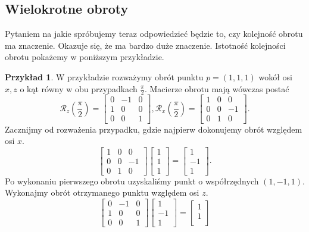 \documentclass[a4paper,twoside,11pt,reqno]{mwrep}
\theoremstyle{plain} \newtheorem{twr}{Twierdzenie}
\theoremstyle{plain} \newtheorem{lem}{Lemat}
\theoremstyle{definition} \newtheorem{defi}{Definicja}
\theoremstyle{remark} \newtheorem*{wni}{Wniosek}
\theoremstyle{definition} \newtheorem{uwaga}{Uwaga}
\theoremstyle{definition}\newtheorem{prz}{Przykład}
\begin{document}
\subsection{Wielokrotne obroty}
Pytaniem na jakie spróbujemy teraz odpowiedzieć będzie to, czy kolejność obrotu ma znaczenie. Okazuje się, że ma bardzo duże znaczenie. 
Istotność kolejności obrotu pokażemy w poniższym przykładzie.
\begin{prz}\label{PrzykladWielokrotnyObrot}
W przykładzie rozważymy obrót punktu $p=(1,1,1)$ wokół osi $x,z$ 
o kąt równy w obu przypadkach $\frac{\pi}{2}$.
Macierze obrotu mają wówczas postać
$$
\mathcal{R}_z\left(\frac{\pi}{2}
\right)=
 \begin{bmatrix}
0   & -1&0 \\
1 & 0 & 0\\
0&0&1
\end{bmatrix},\mathcal{R}_x\left(\frac{\pi}{2}
\right)=\begin{bmatrix}
 1&0&0\\
0&0   & -1\\
0&1 & 0
\end{bmatrix}.$$
Zacznijmy od rozważenia przypadku, gdzie najpierw dokonujemy obrót względem osi $x$.
$$\begin{bmatrix}
 1&0&0\\
0&0   & -1\\
0&1 & 0
\end{bmatrix}\begin{bmatrix}
 1\\
1\\
1 
\end{bmatrix} = \begin{bmatrix}
 1\\
-1\\
1 
\end{bmatrix}. $$
Po wykonaniu pierwszego obrotu uzyskaliśmy punkt o współrzędnych $(1,-1,1)$.
Wykonajmy obrót otrzymanego punktu względem osi $z$.
$$\begin{bmatrix}
0   & -1&0 \\
1 & 0 & 0\\
0&0&1
\end{bmatrix}\begin{bmatrix}
 1\\
-1\\
1 
\end{bmatrix} = \begin{bmatrix}
 1\\
1\\

\end{bmatrix}$$
\end{prz}
\end{document}
